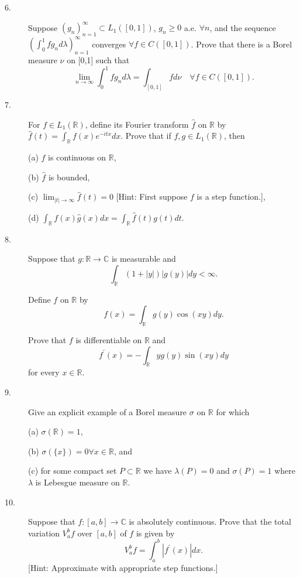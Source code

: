 \documentclass{article}
\def\R{\mathbb R}
\def\C{\mathbb C}
\begin{document}
\begin{description}
\item[6.]
Suppose $(g_n)^\infty_{n=1} \subset L_1 ([0,1])$, $g_n \geq 0$ a.e.
$\forall n$, and the sequence $(\int^1_0 fg_nd \lambda)^\infty_{n=1}$
converges $\forall f \in C([0,1])$. Prove that there is a Borel measure
$\nu$ on [0,1] such that
$$\lim_{n \to \infty} \int^1_0 fg_n d\lambda = \int_{[0,1]} fd\nu
  \quad \forall f \in C ([0,1]).$$

\item[7.]
For $f \in L_1 (\R)$, define its Fourier transform $\widehat f$ on $\R$ by
$\widehat f (t)= \int_\R f(x)e^{-itx} dx$. Prove that if $f,g \in L_1 (\R)$,
then

\item[\quad] (a)
$\widehat f$ is continuous on $\R$,

\item[\quad] (b)
$\widehat f$ is bounded,

\item[\quad] (c)
$\lim_{|t| \to \infty} \widehat f (t) = 0$
[Hint: First suppose $f$ is a step function.],

\item[\quad] (d)
$\int_\R f(x) \widehat g (x) dx = \int_\R \widehat f (t) g(t) dt.$

\item[8.]
Suppose that $g: \R \to \C$ is measurable and
$$\int_\R (1+|y|) |g(y)| dy < \infty.$$

Define $f$ on $\R$ by
$$f(x) = \int_\R g(y) \cos (xy) dy.$$

Prove that $f$ is differentiable on $\R$ and
$$f^\prime (x) = -\int_\R yg(y) \sin (xy) dy$$
for every $x \in \R$.

\item[9.]
Give an explicit example of a Borel measure $\sigma$ on $\R$ for which

\item[\quad] (a)
$\sigma (\R) =1$,

\item[\quad] (b)
$\sigma (\{x\}) = 0 \forall x \in \R$, and

\item[\quad] (c)
for some compact set $P \subset \R$ we have $\lambda (P) = 0$ and
$\sigma (P) =1$ where $\lambda$ is Lebesgue measure on $\R$.

\item[10.]
Suppose that $f:[a,b] \to \C$ is absolutely continuous. Prove that the total
variation $V^b_a f$ over $[a,b]$ of $f$ is given by
$$V^b_a f= \int^b_a |f^\prime (x)| dx.$$
[Hint: Approximate with appropriate step functions.]






\end{description}    
\end{document}
